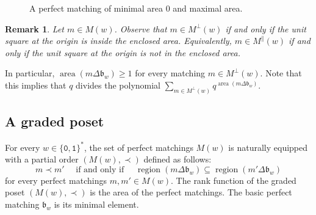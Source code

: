 \documentclass[a4paper,12pt]{amsart}
\newtheorem{remark}[definition]{Remark}
\newcommand{\bfrak}{{\mathfrak{b}}}
\newcommand{\0}{\mathtt{0}}
\newcommand{\1}{\mathtt{1}}
\newcommand{\2}{\mathtt{2}}
\newcommand{\3}{\mathtt{3}}
\newcommand{\carreplein}{{\perp}}
\newcommand{\carrevide}{{\parallel}}
\DeclareMathOperator{\region}{region}
\DeclareMathOperator{\area}{area}
\begin{document}
\begin{figure}[h]
\begin{center}
\end{center}
\caption{A perfect matching of minimal area 0 and maximal area.}
\label{fig:boundary-matching-area}
\end{figure}


\begin{remark}\label{rem:carreplein-interpretation}
Let $m\in M(w)$.
Observe that $m\in M^\carreplein(w)$ if and only if
the unit square at the origin is inside the enclosed area.
Equivalently, $m\in M^\carrevide(w)$ if and only if
the unit square at the origin is not in the enclosed area.
\end{remark}
In particular,
$\area(m\Delta\bfrak_w) \geq 1$
for every matching $m\in M^\carreplein(w)$.
Note that this implies that
$q$ divides the polynomial $\sum_{m\in M^\carreplein(w)} q^{\area(m\Delta\bfrak_w)}$.



\subsection*{A graded poset}
For every $w\in\{\0,\1\}^*$,
the set of perfect matchings $M(w)$ is naturally equipped with a partial order
$(M(w), \prec)$ defined as follows:
\[
    m\prec m'
    \quad
    \text{ if and only if }
    \quad
    \region(m \Delta \bfrak_w)
    \subseteq
    \region(m' \Delta \bfrak_w)
\]
for every perfect matchings $m, m'\in M(w)$.
The rank function of the graded poset $(M(w), \prec)$ is the area of the perfect matchings.
The basic perfect matching $\bfrak_w$ is its minimal element.
\end{document}
